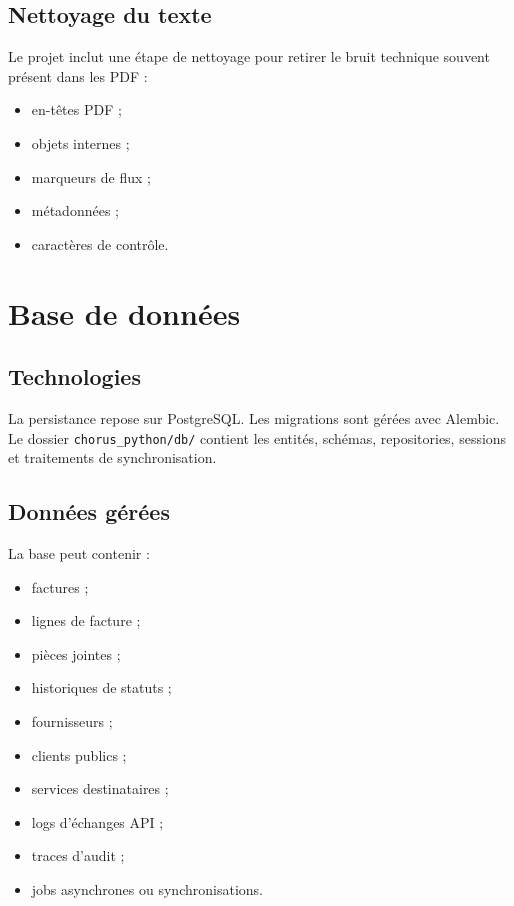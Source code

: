 \documentclass[11pt,a4paper]{article}
\begin{document}
\subsection{Nettoyage du texte}

Le projet inclut une étape de nettoyage pour retirer le bruit technique souvent
présent dans les PDF :

\begin{itemize}
  \item en-têtes PDF ;
  \item objets internes ;
  \item marqueurs de flux ;
  \item métadonnées ;
  \item caractères de contrôle.
\end{itemize}

\section{Base de données}

\subsection{Technologies}

La persistance repose sur PostgreSQL. Les migrations sont gérées avec Alembic.
Le dossier \texttt{chorus\_python/db/} contient les entités, schémas,
repositories, sessions et traitements de synchronisation.

\subsection{Données gérées}

La base peut contenir :

\begin{itemize}
  \item factures ;
  \item lignes de facture ;
  \item pièces jointes ;
  \item historiques de statuts ;
  \item fournisseurs ;
  \item clients publics ;
  \item services destinataires ;
  \item logs d'échanges API ;
  \item traces d'audit ;
  \item jobs asynchrones ou synchronisations.
\end{itemize}
\end{document}
